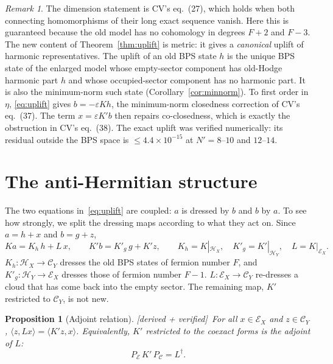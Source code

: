 \documentclass[11pt]{article}
\newcommand{\Np}{N'}
\newcommand{\ip}[2]{\langle #1,#2\rangle}
\newcommand{\eps}{\varepsilon}
\newcommand{\Hc}{\mathcal H}
\newcommand{\Ec}{\mathcal E}
\newcommand{\Cc}{\mathcal C}
\newcommand{\Kh}{K_h}
\newcommand{\Kg}{{K'_g}}
\newcommand{\tagbox}[2]{\textsf{\small\color{#1}[#2]}}
\newcommand{\VER}{\tagbox{cder}{derived + verified}}
\theoremstyle{plain}
\newtheorem{proposition}{Proposition}
\theoremstyle{remark}
\newtheorem*{remark}{Remark}
\numberwithin{equation}{section}
\begin{document}
\begin{remark}
The dimension statement is CV's eq.~(27), which holds when both connecting homomorphisms of their long exact sequence vanish.
Here this is guaranteed because the old model has no cohomology in degrees $F+2$ and $F-3$. The new content of
Theorem~\ref{thm:uplift} is metric: it gives a \emph{canonical} uplift of harmonic representatives. The uplift of an
old BPS state $h$ is the unique BPS state of the enlarged model whose empty-sector component has old-Hodge harmonic part
$h$ and whose occupied-sector component has no harmonic part. It is also the minimum-norm such state
(Corollary~\ref{cor:minnorm}). To first order in $\eta$, \eqref{eq:uplift} gives
$b=-\eps Kh$, the minimum-norm closedness correction of CV's eq.~(37). The term $x=\eps K'b$ then repairs
co-closedness, which is exactly the obstruction in CV's eq.~(38). The exact uplift was verified numerically: its residual
outside the BPS space is $\le4.4\times10^{-15}$ at $\Np=8$--$10$ and $12$--$14$.
\end{remark}

\section{The anti-Hermitian structure}\label{sec:antiherm}

The two equations in~\eqref{eq:uplift} are coupled: $a$ is dressed by $b$ and $b$ by $a$. To see how strongly, we split
the dressing maps according to what they act on. Since $a=h+x$ and $b=g+z$,
\begin{equation}\label{eq:threeops}
Ka=\Kh\,h+L\,x,\qquad K'b=\Kg\,g+K'z,\qquad
\Kh=K|_{\Hc_X},\quad \Kg=K'|_{\Hc_Y},\quad L=K|_{\Ec_X}.
\end{equation}
$\Kh:\Hc_X\to\Cc_Y$ dresses the old BPS states of fermion number $F$, and $\Kg:\Hc_Y\to\Ec_X$ dresses those of
fermion number $F-1$. $L:\Ec_X\to\Cc_Y$ re-dresses a cloud that has come back into the empty sector. The remaining map,
$K'$ restricted to $\Cc_Y$, is not new.

\begin{proposition}[Adjoint relation]\label{prop:adjoint}\VER\
For all $x\in\Ec_X$ and $z\in\Cc_Y$, $\ip{z}{Lx}=\ip{K'z}{x}$. Equivalently, $K'$ restricted to the coexact forms is
the adjoint of $L$:
\begin{equation}\label{eq:adjoint}
P_{\Ec}\,K'\,P_{\Cc}=L^\dagger .
\end{equation}
\end{proposition}
\end{document}
